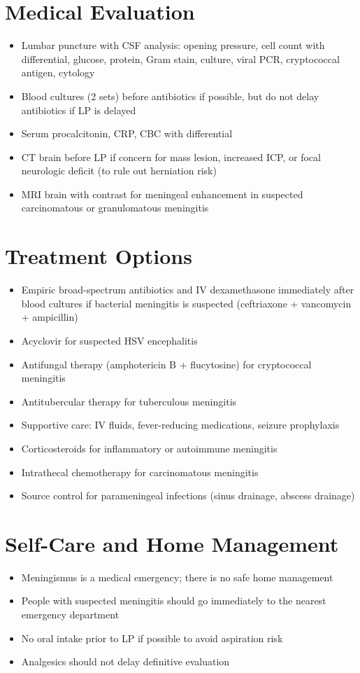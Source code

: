 \section*{Medical Evaluation}
\begin{itemize}
  \item Lumbar puncture with CSF analysis: opening pressure, cell count with differential, glucose, protein, Gram stain, culture, viral PCR, cryptococcal antigen, cytology
  \item Blood cultures (2 sets) before antibiotics if possible, but do not delay antibiotics if LP is delayed
  \item Serum procalcitonin, CRP, CBC with differential
  \item CT brain before LP if concern for mass lesion, increased ICP, or focal neurologic deficit (to rule out herniation risk)
  \item MRI brain with contrast for meningeal enhancement in suspected carcinomatous or granulomatous meningitis
\end{itemize}

\section*{Treatment Options}
\begin{itemize}
  \item Empiric broad-spectrum antibiotics and IV dexamethasone immediately after blood cultures if bacterial meningitis is suspected (ceftriaxone + vancomycin + ampicillin)
  \item Acyclovir for suspected HSV encephalitis
  \item Antifungal therapy (amphotericin B + flucytosine) for cryptococcal meningitis
  \item Antitubercular therapy for tuberculous meningitis
  \item Supportive care: IV fluids, fever-reducing medications, seizure prophylaxis
  \item Corticosteroids for inflammatory or autoimmune meningitis
  \item Intrathecal chemotherapy for carcinomatous meningitis
  \item Source control for parameningeal infections (sinus drainage, abscess drainage)
\end{itemize}

\section*{Self-Care and Home Management}
\begin{itemize}
  \item Meningismus is a medical emergency; there is no safe home management
  \item People with suspected meningitis should go immediately to the nearest emergency department
  \item No oral intake prior to LP if possible to avoid aspiration risk
  \item Analgesics should not delay definitive evaluation
\end{itemize}

